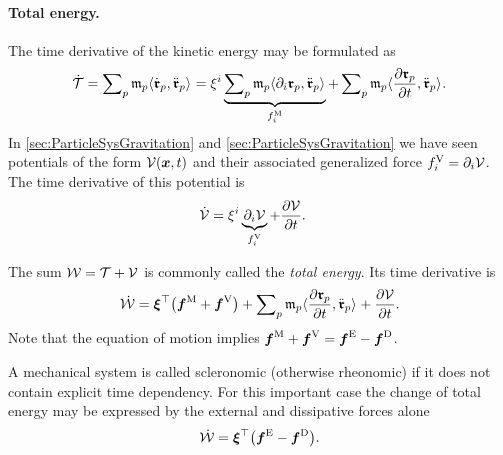 \paragraph{Total energy.}
The time derivative of the kinetic energy may be formulated as
\begin{align}
 \dot{\kineticEnergy} = \sumParticles \particleMass{\PidxI} \sProd{\particlePosd{\PidxI}}{\particlePosdd{\PidxI}} 
 = \sysVelCoeff{\LidxI} \underbrace{\sumParticles \particleMass{\PidxI} \sProd{\dirDiff{\LidxI}\particlePos{\PidxI}}{\particlePosdd{\PidxI}}}_{\genForceInertiaCoeff{\LidxI}}
 + \sumParticles \particleMass{\PidxI} \sProd{\pdiff[\particlePos{\PidxI}]{t}}{\particlePosdd{\PidxI}}.
\end{align}	
In \autoref{sec:ParticleSysGravitation} and \autoref{sec:ParticleSysGravitation} we have seen potentials of the form $\potentialEnergy(\sysCoord, t)$ and their associated generalized force $\genForcePotentialCoeff{\LidxI} = \dirDiff{\LidxI} \potentialEnergy$.
The time derivative of this potential is
\begin{align}
 \dot{\potentialEnergy} &= \sysVelCoeff{\LidxI} \underbrace{\dirDiff{\LidxI} \potentialEnergy}_{\genForcePotentialCoeff{\LidxI}} + \pdiff[\potentialEnergy]{t}.
\end{align}

The sum $\totalEnergy = \kineticEnergy + \potentialEnergy$ is commonly called the \textit{total energy}.
Its time derivative is
\begin{align}
 \dot{\totalEnergy} = \sysVel^\top \big( \genForceInertia + \genForcePotential \big) + \sumParticles \particleMass{\PidxI} \sProd{\pdiff[\particlePos{\PidxI}]{t}}{\particlePosdd{\PidxI}} + \pdiff[\potentialEnergy]{t}
 .
\end{align}
Note that the equation of motion implies $\genForceInertia + \genForcePotential = \genForceEx - \genForceDiss$.

A mechanical system is called scleronomic (otherwise rheonomic) if it does not contain explicit time dependency. 
For this important case the change of total energy may be expressed by the external and dissipative forces alone
\begin{align}
 \dot{\totalEnergy} = \sysVel^\top \big( \genForceEx - \genForceDiss \big) %
 .
\end{align}

